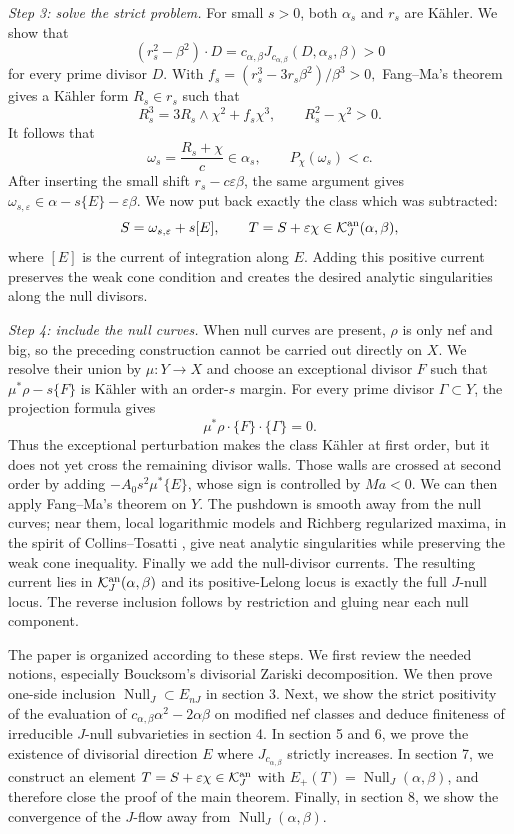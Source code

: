 \documentclass[reqno]{amsart}
\theoremstyle{remark}
\newcommand{\JNull}{\operatorname{Null}_{J}}
\newcommand{\JEnK}{E_{nJ}}
\newcommand{\cab}{c_{\alpha,\beta}}
\def\cK{{\mathcal K}}
\theoremstyle{plain}
\begin{document}
\smallskip
\noindent\emph{Step 3: solve the strict problem.}
For small $s>0$, both $\alpha_s$ and $r_s$ are K\"ahler.  We show that
\[
 (r_s^2-\beta^2)\cdot D=\cab J_{\cab}(D,\alpha_s,\beta)>0
\]
for every prime divisor $D$.  With $f_s={(r_s^3-3r_s\beta^2)}/{\beta^3}>0,$
Fang--Ma's theorem \cite{FM24} gives a K\"ahler form $R_s\in r_s$
such that
\[
 R_s^3=3R_s\wedge\chi^2+f_s\chi^3,
 \qquad R_s^2-\chi^2>0.
\]
It follows that
\[
 \omega_s=\frac{R_s+\chi}{c}\in\alpha_s,
 \qquad P_\chi(\omega_s)<c.
\]
After inserting the small shift $r_s-c\varepsilon\beta$, the same
argument gives
$\omega_{s,\varepsilon}\in
\alpha-s\{E\}-\varepsilon\beta$.  We now put back exactly the class
which was subtracted:
\[
 S=\omega_{s,\varepsilon}+s[E],\qquad
 T=S+\varepsilon\chi\in\mathcal K_J^{\rm an}(\alpha,\beta),
\]
where $[E]$ is the current of integration along $E$.  Adding this
positive current preserves the weak cone condition and creates the
desired analytic singularities along the null divisors.

\smallskip
\noindent\emph{Step 4: include the null curves.}
When null curves are present, $\rho$ is only nef and big, so the
preceding construction cannot be carried out directly on $X$.  We
resolve their union by $\mu:Y\to X$ and choose an exceptional divisor
$F$ such that $\mu^*\rho-s\{F\}$ is K\"ahler with an order-$s$
margin.  For every prime divisor $\Gamma\subset Y$, the projection
formula gives
\[
 \mu^*\rho\cdot\{F\}\cdot\{\Gamma\}=0.
\]
Thus the exceptional perturbation makes the class K\"ahler at first
order, but it does not yet cross the remaining divisor walls.  Those
walls are crossed at second order by adding
$-A_0s^2\mu^*\{E\}$, whose sign is controlled by $Ma<0$.  We can
then apply Fang--Ma's theorem  on $Y$.  The pushdown is smooth away from the
null curves; near them, local logarithmic models and Richberg
regularized maxima, in the spirit of Collins--Tosatti
\cite{CT15}, give neat analytic singularities while
preserving the weak cone inequality.  Finally we add the null-divisor
currents.  The resulting current lies in
$\mathcal K_J^{\rm an}(\alpha,\beta)$ and its positive-Lelong locus is
exactly the full $J$-null locus.  The reverse inclusion follows by
restriction and gluing near each null component.

The paper is organized according to these steps.  We first review the needed
notions, especially  Boucksom's divisorial Zariski decomposition.  We then prove one-side inclusion $\JNull\subset \JEnK$ in section 3. Next, we show the strict positivity of the evaluation of $\cab\alpha^2-2\alpha\beta$ on modified nef classes and deduce finiteness of irreducible $J$-null subvarieties in section 4.  In section 5 and 6, we prove the existence of divisorial direction $E$ where $J_{\cab}$ strictly increases. In section 7, we construct an element $T=S+\varepsilon\chi\in \cK_J^{\rm an}$ with $E_+(T)=\JNull(\alpha,\beta)$, and therefore close the proof of the main theorem. Finally, in section 8, we show the convergence of the $J$-flow away from $\JNull(\alpha,\beta).$
\end{document}
